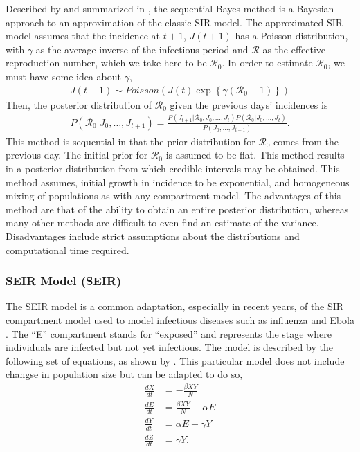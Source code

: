 \documentclass[12pt]{article}
\newcommand{\rr}{\ensuremath{\mathcal{R}_0}}
\begin{document}
Described by \cite{bettencourt2008} and summarized in \cite{obadia2012r0}, the sequential Bayes method is a Bayesian approach to an approximation of the classic SIR model.  The approximated SIR model assumes that the incidence at $t+1$, $J(t+1)$ has a Poisson distribution, with $\gamma$ as the  average inverse of the infectious period and $\mathcal{R}$ as the effective reproduction number, which we take here to be $\rr$. In order to estimate $\rr$, we must have some idea about $\gamma$,
\begin{align*}
J(t+1)  \sim Poisson( J(t) \exp \left \{  \gamma (\rr-1)\right \})
\end{align*}
Then, the posterior distribution of $\rr$ given the previous days' incidences is
\begin{align*}
  P(\rr | J_0, \dots, J_{t+1}) = \frac{P(J_{t+1} | \rr, J_0, \dots, J_t)P(\rr| J_0, \dots, J_t)}{P(J_0, \dots, J_{t+1})}.
\end{align*}
This method is sequential in that the prior distribution for $\rr$ comes from the previous day.  The initial prior for $\rr$ is assumed to be flat.  This method results in a posterior distribution from which credible intervals may be obtained.  This method assumes, initial growth in incidence to be exponential, and homogeneous mixing of populations as with any compartment model.  The advantages of this method are that of the ability to obtain an entire posterior distribution, whereas many other methods are difficult to even find an estimate of the variance.  Disadvantages include strict assumptions about the distributions and computational time required. 




\subsubsection{SEIR Model (SEIR)}
\label{sec:seir-model}

The SEIR model is a common adaptation, especially in recent years, of the SIR compartment model used to model infectious diseases such as influenza and Ebola \citep{mills2004,althaus2014}.  The ``E'' compartment stands for ``exposed'' and represents the stage where individuals are infected but not yet infectious.  The model is described by the following set of equations, as shown by \cite{cintronarias2009}.  This particular model  does not include changse in population size but can be adapted to do so,
\begin{align*}
  \frac{dX}{dt} &= - \frac{\beta XY}{N} \\
  \frac{dE}{dt} &= \frac{\beta XY}{N}  - \alpha E\\
  \frac{dY}{dt} &= \alpha E - \gamma Y \\
  \frac{dZ}{dt} &= \gamma Y.
\end{align*}
\end{document}
